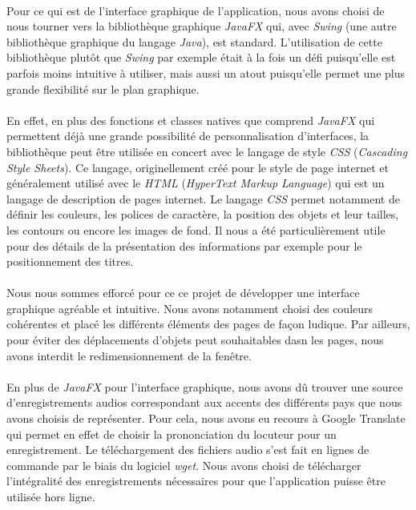 \documentclass[11pt, a4paper]{report}
\begin{document}
\paragraph{}Pour ce qui est de l'interface graphique de l'application, nous avons choisi de nous tourner vers la bibliothèque graphique \textit{JavaFX} qui, avec \textit{Swing} (une autre bibliothèque graphique du langage \textit{Java}), est standard. L'utilisation de cette bibliothèque plutôt que \textit{Swing} par exemple était à la fois un défi puisqu'elle est parfois moins intuitive à utiliser, mais aussi un atout puisqu'elle permet une plus grande flexibilité sur le plan graphique.

\paragraph{}En effet, en plus des fonctions et classes natives que comprend \textit{JavaFX} qui permettent déjà une grande possibilité de personnalisation d'interfaces, la bibliothèque peut être utilisée en concert avec le langage de style \textit{CSS} (\textit{Cascading Style Sheets}). Ce langage, originellement créé pour le style de page internet et généralement utilisé avec le \textit{HTML} (\textit{HyperText Markup Language}) qui est un langage de description de pages internet. Le langage \textit{CSS} permet notamment de définir les couleurs, les polices de caractère, la position des objets et leur tailles, les contours ou encore les images de fond. Il nous a été particulièrement utile pour des détails de la présentation des informations par exemple pour le positionnement des titres.

\paragraph{}Nous nous sommes efforcé pour ce ce projet de développer une interface graphique agréable et intuitive. Nous avons notamment choisi des couleurs cohérentes et placé les différents éléments des pages de façon ludique. Par ailleurs, pour éviter des déplacements d'objets peut souhaitables dasn les pages, nous avons interdit le redimensionnement de la fenêtre.

\paragraph{}En plus de \textit{JavaFX} pour l'interface graphique, nous avons dû trouver une source d'enregistrements audios correspondant aux accents des différents pays que nous avons choisis de représenter. Pour cela, nous avons eu recours à Google Translate qui permet en effet de choisir la prononciation du locuteur pour un enregistrement. Le téléchargement des fichiers audio s'est fait en lignes de commande par le biais du logiciel \textit{wget}. Nous avons choisi de télécharger l'intégralité des enregistrements nécessaires pour que l'application puisse être utilisée hors ligne.
\end{document}
